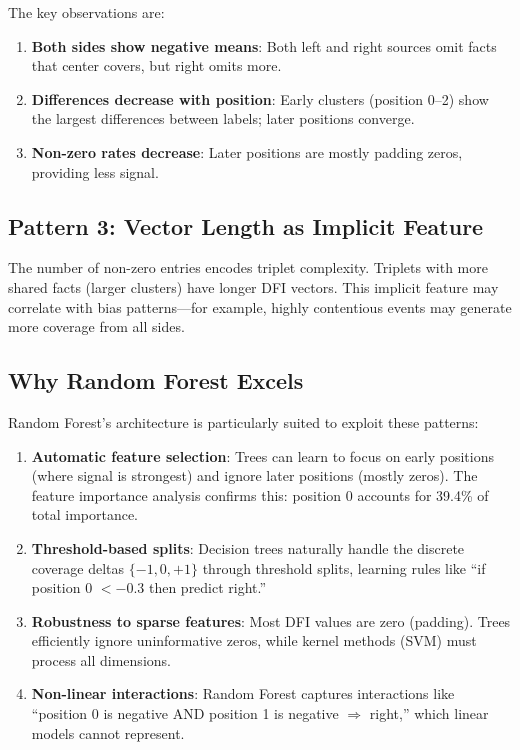 \documentclass[12pt,a4paper]{article}
\begin{document}
The key observations are:
\begin{enumerate}
\item \textbf{Both sides show negative means}: Both left and right sources omit facts that
      center covers, but right omits more.
\item \textbf{Differences decrease with position}: Early clusters (position 0--2) show the
      largest differences between labels; later positions converge.
\item \textbf{Non-zero rates decrease}: Later positions are mostly padding zeros, providing
      less signal.
\end{enumerate}

\subsection{Pattern 3: Vector Length as Implicit Feature}

The number of non-zero entries encodes triplet complexity. Triplets with more shared facts
(larger clusters) have longer DFI vectors. This implicit feature may correlate with bias
patterns---for example, highly contentious events may generate more coverage from all sides.

\subsection{Why Random Forest Excels}

Random Forest's architecture is particularly suited to exploit these patterns:

\begin{enumerate}
\item \textbf{Automatic feature selection}: Trees can learn to focus on early positions
      (where signal is strongest) and ignore later positions (mostly zeros). The feature
      importance analysis confirms this: position 0 accounts for 39.4\% of total importance.

\item \textbf{Threshold-based splits}: Decision trees naturally handle the discrete coverage
      deltas $\{-1, 0, +1\}$ through threshold splits, learning rules like
      ``if position 0 $< -0.3$ then predict right.''

\item \textbf{Robustness to sparse features}: Most DFI values are zero (padding). Trees
      efficiently ignore uninformative zeros, while kernel methods (SVM) must process all
      dimensions.

\item \textbf{Non-linear interactions}: Random Forest captures interactions like
      ``position 0 is negative AND position 1 is negative $\Rightarrow$ right,'' which
      linear models cannot represent.
\end{enumerate}
\end{document}
